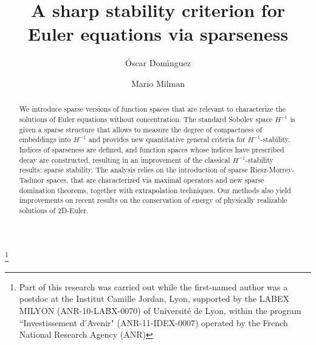 \documentclass[11pt, a4paper,leqno]{amsart}
\theoremstyle{plain}
\numberwithin{equation}{section}
\theoremstyle{definition}
\theoremstyle{remark}
\begin{document}
\title[A sharp stability criterion for Euler equations via sparseness]{A sharp stability criterion for Euler equations via sparseness}

\author{\'{O}scar Dom\'{\i}nguez}
\address{O. Dom\'inguez, Departamento de An\'alisis Matem\'atico y Matem\'atica
Aplicada, Facultad de Matem\'aticas, Universidad Complutense de Madrid, Plaza
de Ciencias 3, 28040 Madrid, Spain}

\author{Mario Milman}
\address{M. Milman, Instituto Argentino de Matematica\\
Buenos Aires\\
Argentina}

\thanks{Part of this research was carried out while the first-named author was a postdoc at the Institut Camille Jordan, Lyon, supported by the LABEX
MILYON (ANR-10-LABX-0070) of Universit\'{e} de Lyon, within the program
\textquotedblleft Investissement d'Avenir" (ANR-11-IDEX-0007) operated by the
French National Research Agency (ANR)}

\begin{abstract}
We introduce sparse versions of function spaces that are relevant to
characterize the solutions of Euler equations without concentration. The standard 
Sobolev space $H^{-1}$ is given a sparse structure that
allows to measure the degree of compactness of embeddings into $H^{-1}$ and
provides new quantitative general criteria for $H^{-1}$-stability. 
Indices of sparseness are defined, and function spaces whose indices have
prescribed decay are constructed, resulting in an improvement of the classical
$H^{-1}$-stability results: sparse stability. The analysis relies on the introduction of
sparse Riesz-Morrey-Tadmor spaces, that are characterized via maximal
operators and new sparse domination theorems, together with extrapolation techniques. Our methods also yield
improvements on recent results on the conservation of energy of physically
realizable solutions of $2$D-Euler. 

\end{abstract}
\maketitle
\tableofcontents
\end{document}
